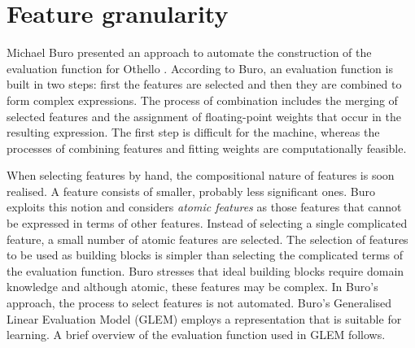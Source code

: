\section{Feature granularity}
\label{sec:knowledge-granularity}
Michael Buro presented an approach to automate the construction of the evaluation function for Othello \cite{buro:feature}.  According to Buro, an evaluation function is built in two steps: first the features are selected and then they are combined to form complex expressions.  The process of combination includes the merging of selected features and the assignment of floating-point weights that occur in the resulting expression. The first step is difficult for the machine, whereas the processes of combining features and fitting weights are computationally feasible.

When selecting features by hand, the compositional nature of features is soon realised.  A feature consists of smaller, probably less significant ones.  Buro exploits this notion and considers {\it atomic features} as those features  that cannot be expressed in terms of other features.  Instead of selecting a single complicated feature,  a small number of atomic features are selected. The selection of features to be used as building blocks is simpler than selecting the complicated terms of the evaluation function.  Buro stresses that ideal building blocks require domain knowledge and although atomic, these features may be complex.  In Buro's approach, the process to select features is not automated.  Buro's Generalised Linear Evaluation Model (GLEM) employs a representation that is suitable for learning. A brief overview of the evaluation function used in GLEM follows.

